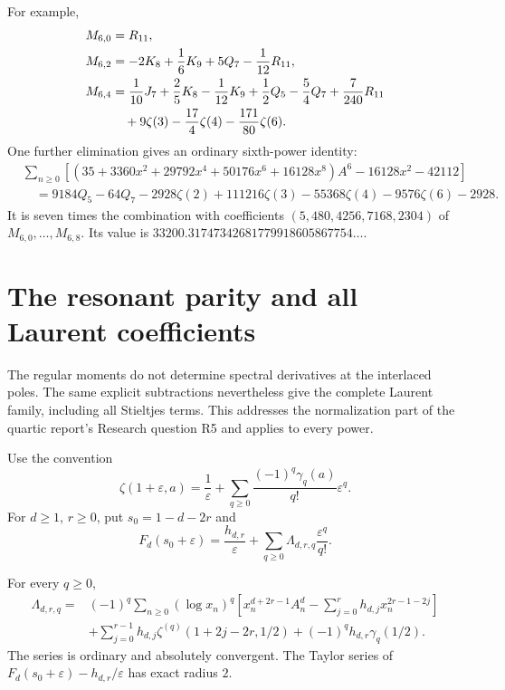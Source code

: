 For example,
\begin{align}
 M_{6,0}&=R_{11},\notag\\
 M_{6,2}&=-2K_8+\frac16K_9+5Q_7-\frac1{12}R_{11},\notag\\
 M_{6,4}&=\frac1{10}J_7+\frac25K_8-\frac1{12}K_9
       +\frac12Q_5-\frac54Q_7+\frac7{240}R_{11}\notag\\
       &\quad+9\zeta(3)-\frac{17}{4}\zeta(4)
                       -\frac{171}{80}\zeta(6).
                       \label{tp:eq:M6examples}
\end{align}
One further elimination gives an ordinary sixth-power identity:
\begin{equation}\label{tp:eq:main6}
 \begin{split}
 &\sum_{n\geq0}\left[
 (35+3360x^2+29792x^4+50176x^6+16128x^8)A^6
                    -16128x^2-42112\right]\\
 &\quad=9184Q_5-64Q_7-2928\zeta(2)+111216\zeta(3)
          -55368\zeta(4)-9576\zeta(6)-2928.
 \end{split}
\end{equation}
It is seven times the combination with coefficients
$(5,480,4256,7168,2304)$ of $M_{6,0},\ldots,M_{6,8}$.
Its value is $33200.31747342681779918605867754\ldots$.

\section{The resonant parity and all Laurent coefficients}
\label{tp:sec:resonance}

The regular moments do not determine spectral derivatives at the
interlaced poles.  The same explicit subtractions nevertheless give
the complete Laurent family, including all Stieltjes terms.  This
addresses the normalization part of the quartic report's Research
question R5 and applies to every power.

Use the convention
\begin{equation}\label{tp:eq:Stieltjes}
 \zeta(1+\varepsilon,a)=\frac1\varepsilon+
   \sum_{q\geq0}\frac{(-1)^q\gamma_q(a)}{q!}\varepsilon^q.
\end{equation}
For $d\geq1$, $r\geq0$, put $s_0=1-d-2r$ and
\[
 F_d(s_0+\varepsilon)=\frac{h_{d,r}}\varepsilon+
                 \sum_{q\geq0}\Lambda_{d,r,q}\frac{\varepsilon^q}{q!}.
\]

\begin{theorem}
\label{tp:thm:Laurent}
For every $q\geq0$,
\begin{equation}\label{tp:eq:Laurent}
 \boxed{\begin{aligned}
 \Lambda_{d,r,q}={}&(-1)^q\sum_{n\geq0}(\log x_n)^q
 \left[x_n^{d+2r-1}A_n^d-
       \sum_{j=0}^{r}h_{d,j}x_n^{2r-1-2j}\right]\\
 &+\sum_{j=0}^{r-1}h_{d,j}
        \zeta^{(q)}(1+2j-2r,1/2)
       +(-1)^qh_{d,r}\gamma_q(1/2).
 \end{aligned}}
\end{equation}
The series is ordinary and absolutely convergent.  The Taylor series
of $F_d(s_0+\varepsilon)-h_{d,r}/\varepsilon$ has exact radius $2$.
\end{theorem}

